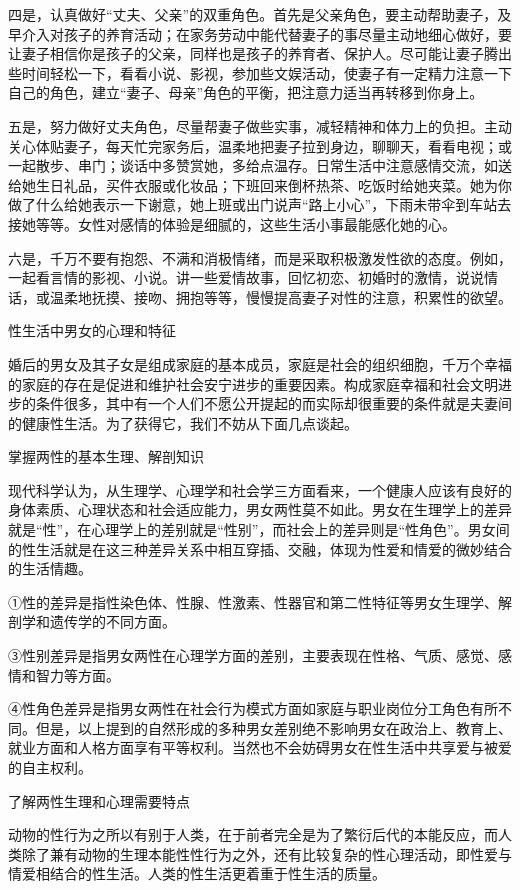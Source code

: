 \documentclass[12pt,UTF8]{ctexbook}
\begin{document}
四是，认真做好“丈夫、父亲”的双重角色。首先是父亲角色，要主动帮助妻子，及早介入对孩子的养育活动；在家务劳动中能代替妻子的事尽量主动地细心做好，要让妻子相信你是孩子的父亲，同样也是孩子的养育者、保护人。尽可能让妻子腾出些时间轻松一下，看看小说、影视，参加些文娱活动，使妻子有一定精力注意一下自己的角色，建立“妻子、母亲”角色的平衡，把注意力适当再转移到你身上。

五是，努力做好丈夫角色，尽量帮妻子做些实事，减轻精神和体力上的负担。主动关心体贴妻子，每天忙完家务后，温柔地把妻子拉到身边，聊聊天，看看电视；或一起散步、串门；谈话中多赞赏她，多给点温存。日常生活中注意感情交流，如送给她生日礼品，买件衣服或化妆品；下班回来倒杯热茶、吃饭时给她夹菜。她为你做了什么给她表示一下谢意，她上班或出门说声“路上小心”，下雨未带伞到车站去接她等等。女性对感情的体验是细腻的，这些生活小事最能感化她的心。

六是，千万不要有抱怨、不满和消极情绪，而是采取积极激发性欲的态度。例如，一起看言情的影视、小说。讲一些爱情故事，回忆初恋、初婚时的激情，说说情话，或温柔地抚摸、接吻、拥抱等等，慢慢提高妻子对性的注意，积累性的欲望。





性生活中男女的心理和特征


婚后的男女及其子女是组成家庭的基本成员，家庭是社会的组织细胞，千万个幸福的家庭的存在是促进和维护社会安宁进步的重要因素。构成家庭幸福和社会文明进步的条件很多，其中有一个人们不愿公开提起的而实际却很重要的条件就是夫妻间的健康性生活。为了获得它，我们不妨从下面几点谈起。

掌握两性的基本生理、解剖知识

现代科学认为，从生理学、心理学和社会学三方面看来，一个健康人应该有良好的身体素质、心理状态和社会适应能力，男女两性莫不如此。男女在生理学上的差异就是“性”，在心理学上的差别就是“性别”，而社会上的差异则是“性角色”。男女间的性生活就是在这三种差异关系中相互穿插、交融，体现为性爱和情爱的微妙结合的生活情趣。

①性的差异是指性染色体、性腺、性激素、性器官和第二性特征等男女生理学、解剖学和遗传学的不同方面。

③性别差异是指男女两性在心理学方面的差别，主要表现在性格、气质、感觉、感情和智力等方面。

④性角色差异是指男女两性在社会行为模式方面如家庭与职业岗位分工角色有所不同。但是，以上提到的自然形成的多种男女差别绝不影响男女在政治上、教育上、就业方面和人格方面享有平等权利。当然也不会妨碍男女在性生活中共享爱与被爱的自主权利。

了解两性生理和心理需要特点

动物的性行为之所以有别于人类，在于前者完全是为了繁衍后代的本能反应，而人类除了兼有动物的生理本能性性行为之外，还有比较复杂的性心理活动，即性爱与情爱相结合的性生活。人类的性生活更着重于性生活的质量。
\end{document}
